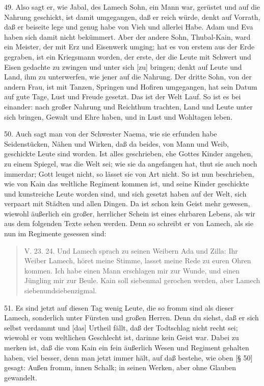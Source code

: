 49. Also sagt er, wie Jabal, des Lamech Sohn, ein Mann war, gerüstet und auf die Nahrung geschickt, ist damit umgegangen, daß er reich würde, denkt auf Vorrath, daß er beiseite lege und genug habe von Vieh und allerlei Habe. Adam und Eva haben sich damit nicht bekümmert. Aber der andere Sohn, Thubal-Kain, ward ein Meister, der mit Erz und Eisenwerk umging; hat es von erstem aus der Erde gegraben, ist ein Kriegsmann worden, der erste, der die Leute mit Schwert und Eisen gedachte zu zwingen und unter sich [zu] bringen; denkt auf Leute und Land, ihm zu unterwerfen, wie jener auf die Nahrung. Der dritte Sohn, von der andern Frau, ist mit Tanzen, Springen und Hofiren umgegangen, hat sein Datum auf gute Tage, Lust und Freude gesetzt. Das ist der Welt Lauf. So ist es bei einander: nach großer Nahrung und Reichthum trachten, Land und Leute unter sich bringen, Gewalt und Ehre haben, und in Lust und Wohltagen leben.

50. Auch sagt man von der Schwester Naema, wie sie erfunden habe Seidenstücken, Nähen und Wirken, daß da beides, von Mann und Weib, geschickte Leute sind worden. Ist alles geschrieben, ehe Gottes Kinder angehen, zu einem Spiegel, was die Welt sei; wie sie da angefangen hat, thut sie auch noch immerdar; Gott leuget nicht, so lässet sie von Art nicht. So ist nun beschrieben, wie von Kain das weltliche Regiment kommen ist, und seine Kinder geschickte und kunstreiche Leute worden sind, und sich gesetzt haben auf der Welt, sich verpaart mit Städten und allen Dingen. Da ist schon kein Geist mehr gewesen, wiewohl äußerlich ein großer, herrlicher Schein ist eines ehrbaren Lebens, als wir aus dem folgenden Texte sehen werden. Denn so schreibt er von Lamech, als sie nun im Regimente gesessen sind:

\begin{quote}
V. 23. 24. Und Lamech sprach zu seinen Weibern Ada und Zilla: Ihr Weiber Lamech, höret meine Stimme, lasset meine Rede zu euren Ohren kommen. Ich habe einen Mann erschlagen mir zur Wunde, und einen Jüngling mir zur Beule. Kain soll siebenmal gerochen werden, aber Lamech siebenundsiebenzigmal.
\end{quote}

51. Es sind jetzt auf diesen Tag wenig Leute, die so fromm sind als dieser Lamech, sonderlich unter Fürsten und großen Herren. Denn du siehst, daß er sich selbst verdammt und [das] Urtheil fällt, daß der Todtschlag nicht recht sei; wiewohl er vom weltlichen Geschlecht ist, darinne kein Geist war. Dabei zu merken ist, daß die vom Kain ein fein äußerlich Wesen und Regiment gehalten haben, viel besser, denn man jetzt immer hält, auf daß bestehe, wie oben [§ 50] gesagt: Außen fromm, innen Schalk; in seinen Werken, aber ohne Glauben gewandelt.

